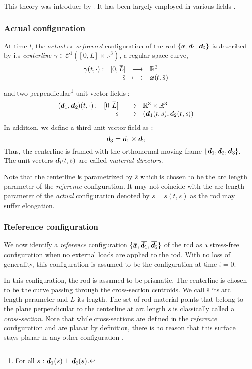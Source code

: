 This theory was introduce by \cite{Antman1974}. It has been largely employed in various fields \cite{Shi1995, Bergou2010}.

\subsubsection{Actual configuration}

At time $t$, the \emph{actual} or \emph{deformed} configuration of the rod $\{{\boldsymbol{x}}, {\boldsymbol{d}_1}, {\boldsymbol{d}_2}\}$ is described by its \emph{centerline} $\gamma \in \mathcal{C}^1([0,{L}]\times \mathbb{R}^3)$, a regular space curve, 
\begin{equation}
	\fonctionL{\gamma(t, \cdot)}{[0,\overbar{L}]}{\mathbb{R}^3}{\overbar{s}}{\vect{x}(t,\overbar{s})}
\end{equation}
and two perpendicular\footnote{For all $s$ : $\boldsymbol{d}_1(s) \perp \boldsymbol{d}_2(s)$.} unit vector fields : 
\begin{equation}
	\fonctionL{(\vect{d}_1,\vect{d}_2)(t, \cdot)}{[0,\overbar{L}]}{\mathbb{R}^3 \times \mathbb{R}^3}{\overbar{s}}{(\vect{d}_1(t,\overbar{s}), \vect{d}_2(t,\overbar{s}))}
\end{equation}
In addition, we define a third unit vector field as : 
\begin{equation}
	\boldsymbol{d}_3 = \boldsymbol{d}_1 \times \boldsymbol{d}_2
\end{equation}
Thus, the centerline is framed with the orthonormal moving frame $\{\boldsymbol{d}_1, \boldsymbol{d}_2, \boldsymbol{d}_3\}$. The unit vectors $\vect{d}_i(t,\overbar{s})$ are called \emph{material directors}.

Note that the centerline is parametrized by $\overbar{s}$ which is chosen to be the arc length parameter of the \emph{reference} configuration. It may not coincide with the arc length parameter of the \emph{actual} configuration denoted by $s = s(t, \overbar{s})$ as the rod may suffer elongation.

\subsubsection{Reference configuration}
We now identify a \emph{reference} configuration $\{\overbar{\vect{x}}, \overbar{\vect{d}_1}, \overbar{\vect{d}_2}\}$ of the rod as a stress-free configuration when no external loads are applied to the rod. With no loss of generality, this configuration is assumed to be the configuration at time $t=0$. 

In this configuration, the rod is assumed to be prismatic. The centerline is chosen to be the curve passing through the cross-section centroids. We call $\overbar{s}$ its arc length parameter and $\overbar{L}$ its length. The set of rod material points that belong to the plane perpendicular to the centerline at arc length $\overbar{s}$ is classically called a \emph{cross-section}. Note that while cross-sections are defined in the \emph{reference} configuration and are planar by definition, there is no reason that this surface stays planar in any other configuration \cite[p.~5]{Dill1992}.

